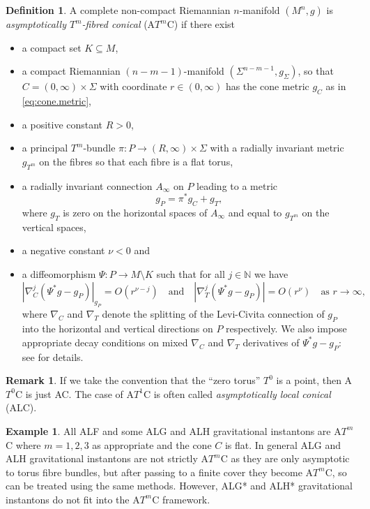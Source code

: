 \documentclass{article}
\theoremstyle{definition}
\newtheorem{dfn}[thm]{Definition}
\newtheorem{rmk}[thm]{Remark}
\newtheorem{eg}[thm]{Example}
\numberwithin{thm}{section}
\numberwithin{equation}{section}
\def\N{\mathbb{N}}
\begin{document}
\begin{dfn}\label{dfn:ATC} A complete non-compact Riemannian $n$-manifold $(M^n,g)$ is \emph{asymptotically $T^m$-fibred conical} (A$T^m$C) if there exist
\begin{itemize}
    \item a compact set $K \subseteq M$,
    \item a compact Riemannian $(n-m-1)$-manifold $(\Sigma^{n-m-1},g_{\Sigma})$, so that $C=(0,\infty)\times\Sigma$ with coordinate $r\in(0,\infty)$ has the cone metric $g_C$ as in \eqref{eq:cone.metric},
    \item a positive constant $R>0$,
    \item a principal $T^m$-bundle $\pi:P\to (R,\infty)\times\Sigma$ with a radially invariant metric $g_{T^m}$ on the fibres so that each fibre is a flat torus,
    \item a radially invariant connection $A_{\infty}$ on $P$ leading to a metric
    \begin{equation}
        g_P=\pi^*g_C+g_{T},
    \end{equation}
    where $g_T$ is zero on the horizontal spaces of $A_{\infty}$ and equal to $g_{T^m}$ on the vertical spaces,
    \item a negative constant $\nu<0$ and
    \item a diffeomorphism $\Psi:P\to M\setminus K$ such that for all $j\in\N$ we have
    \begin{equation}
        |\nabla^j_C(\Psi^*g-g_P)|_{g_P}=O(r^{\nu-j})\quad\text{and}\quad|\nabla^j_T(\Psi^*g-g_P)|=O(r^{\nu})\quad\text{as $r\to\infty$,}
    \end{equation}
    where $\nabla_C$ and $\nabla_T$ denote the splitting of the Levi-Civita connection of $g_P$ into the horizontal and vertical directions on $P$ respectively.  We also impose appropriate decay conditions on mixed $\nabla_C$ and $\nabla_T$ derivatives of $\Psi^*g-g_P$: see \cite[Definition 3.13]{Cavalleri} for details.
\end{itemize}

\end{dfn}

\begin{rmk} If we take the convention that the ``zero torus'' $T^0$ is a point, then A$T^0$C is just AC.  The case of A$T^1$C is often called \emph{asymptotically local conical} (ALC).
\end{rmk}

\begin{eg}\label{eg:ALF-H} All
 ALF and some ALG and ALH gravitational instantons are A$T^m$C   where $m=1,2,3$ as appropriate and  the cone $C$ is flat.  In general ALG and ALH gravitational instantons are not strictly A$T^m$C as they are only asymptotic to torus fibre bundles, but after passing to a finite cover they become A$T^m$C, so can be treated using the same  methods.   However, ALG* and ALH* gravitational instantons do not fit into the A$T^m$C framework.
\end{eg}
\end{document}

